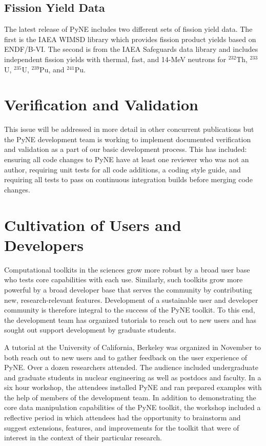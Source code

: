 \documentclass{anstrans}
\begin{document}
\subsection{Fission Yield Data}

The latest release of PyNE includes two different sets of fission yield data. 
The first is the IAEA WIMSD library which provides fission product yields 
based on ENDF/B-VI. The second is from the IAEA Safeguards data library and includes 
independent fission yields with thermal, fast, and 14-MeV neutrons for $^{232}$Th, 
$^{233}$U, $^{235}$U, $^{239}$Pu, and $^{241}$Pu.

\section{Verification and Validation}

This issue will be addressed in more detail in other concurrent publications 
but the PyNE development team is working to implement documented verification 
and validation as a part of our basic development process. This has included: 
ensuring all code changes to PyNE have at least one reviewer who was not an 
author, requiring unit tests for all code additions, a coding style guide, 
and requiring all tests to pass on continuous integration builds before 
merging code changes. 


\section{Cultivation of Users and Developers} 
Computational toolkits in the sciences grow more robust by a broad user base who tests core capabilities with each use. Similarly, such toolkits grow more powerful by a broad developer base that serves the community by contributing new, research-relevant features. Development of a sustainable user and developer community is therefore integral to the success of the PyNE toolkit. To this end, the development team has organized tutorials to reach out to new users and has sought out support development by graduate students.

A tutorial at the University of California, Berkeley was organized in November to both reach out to new users and to gather feedback on the user experience of PyNE. Over a dozen researchers attended. The audience included undergraduate and graduate students in nuclear engineering as well as postdocs and faculty. In a six hour workshop, the attendees installed PyNE and ran prepared examples with the help of members of the development team. In addition to demonstrating the core data manipulation capabilities of the PyNE toolkit, the workshop included a reflective period in which attendees had the opportunity to brainstorm and suggest extensions, features, and improvements for the toolkit that were of interest in the context of their particular research.
\end{document}

